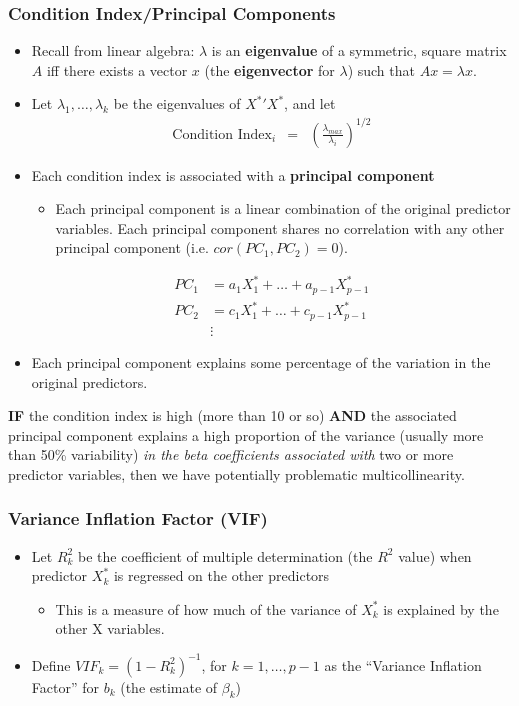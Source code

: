\documentclass[12pt]{../notes}
\begin{document}
\subsubsection{Condition Index/Principal Components}
\begin{itemize}
  \item Recall from linear algebra:  $\lambda$ is an {\bf eigenvalue} of a
symmetric, square matrix ${A}$ iff there exists a vector ${x}$ (the
{\bf eigenvector} for $\lambda$)
such that ${A} {x} = \lambda {x}$.
  \item Let $\lambda_1, \ldots, \lambda_k$ be the eigenvalues of ${X^*}'
{X^*}$, and let
\begin{eqnarray}
  \text{Condition Index}_i & = & \left( \frac{\lambda_{max}}{\lambda_i} \right)^{1/2} \nonumber
\end{eqnarray}
\item Each condition index is associated with a \textbf{principal component}
\begin{itemize}
\item Each principal component is a linear combination of the original predictor variables. Each principal component shares no correlation with any other principal component (i.e. $ cor({PC_1}, {PC_2}) =  0$).
\end{itemize}
\begin{align*}
 {PC_1} & =  a_1 {X^*_1} + \ldots + a_{p-1} {X^*_{p-1}} \\
 {PC_2} & =  c_1 {X^*_1} + \ldots + c_{p-1} {X^*_{p-1}}  \\
 &\vdots
\end{align*}
\item Each principal component explains some percentage of the variation in the original predictors. 
\end{itemize}

\nspace
\textbf{IF} the condition index is high (more than 10 or so) \textbf{AND} the associated principal component explains a high proportion of the variance (usually more than 50\% variability) \textit{in the beta coefficients associated with} two or more predictor variables, then we have potentially problematic multicollinearity. 


\subsubsection{Variance Inflation Factor (VIF)}
\begin{itemize}
  \item Let $R_k^2$ be the coefficient of multiple determination (the $R^2$ value) when predictor $X^*_k$ is regressed on the other predictors
  \begin{itemize}
  \item This is a measure of how much of the variance of $X^*_k$ is explained by the other X variables. 
  \end{itemize}
   \item Define $VIF_k = (1-R_k^2)^{-1}$, for $k=1,\ldots,p-1$ as the ``Variance Inflation Factor'' for $b_k$ (the estimate of $\beta_k$)
\end{itemize}
\end{document}
